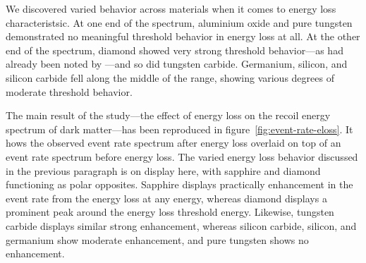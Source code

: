 We discovered varied behavior across materials when it comes to energy loss characteristsic. At one end of the spectrum, aluminium oxide and pure tungsten demonstrated no meaningful threshold behavior in energy loss at all. At the other end of the spectrum, diamond showed very strong threshold behavior---as had already been noted by \textcite{KadribasicEtAl2020}---and so did tungsten carbide. Germanium, silicon, and silicon carbide fell along the middle of the range, showing various degrees of moderate threshold behavior.

The main result of the study---the effect of energy loss on the recoil energy spectrum of dark matter---has been reproduced in figure~\ref{fig:event-rate-eloss}. It hows the observed event rate spectrum after energy loss overlaid on top of an event rate spectrum before energy loss. The varied energy loss behavior discussed in the previous paragraph is on display here, with sapphire and diamond functioning as polar opposites. Sapphire displays practically enhancement in the event rate from the energy loss at any energy, whereas diamond displays a prominent peak around the energy loss threshold energy. Likewise, tungsten carbide displays similar strong enhancement, whereas silicon carbide, silicon, and germanium show moderate enhancement, and pure tungsten shows no enhancement.

